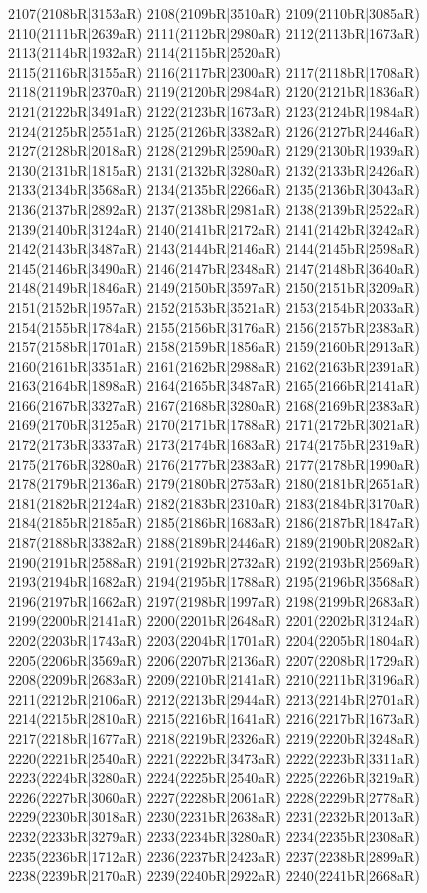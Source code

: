 2107(2108bR|3153aR) 2108(2109bR|3510aR) 2109(2110bR|3085aR) 2110(2111bR|2639aR) 2111(2112bR|2980aR) 2112(2113bR|1673aR) 2113(2114bR|1932aR) 2114(2115bR|2520aR) \\2115(2116bR|3155aR) 2116(2117bR|2300aR) 2117(2118bR|1708aR) 2118(2119bR|2370aR) 2119(2120bR|2984aR) 2120(2121bR|1836aR) 2121(2122bR|3491aR) 2122(2123bR|1673aR) 2123(2124bR|1984aR) \\2124(2125bR|2551aR) 2125(2126bR|3382aR) 2126(2127bR|2446aR) 2127(2128bR|2018aR) 2128(2129bR|2590aR) 2129(2130bR|1939aR) 2130(2131bR|1815aR) 2131(2132bR|3280aR) 2132(2133bR|2426aR) \\2133(2134bR|3568aR) 2134(2135bR|2266aR) 2135(2136bR|3043aR) 2136(2137bR|2892aR) 2137(2138bR|2981aR) 2138(2139bR|2522aR) 2139(2140bR|3124aR) 2140(2141bR|2172aR) 2141(2142bR|3242aR) \\2142(2143bR|3487aR) 2143(2144bR|2146aR) 2144(2145bR|2598aR) 2145(2146bR|3490aR) 2146(2147bR|2348aR) 2147(2148bR|3640aR) 2148(2149bR|1846aR) 2149(2150bR|3597aR) 2150(2151bR|3209aR) \\2151(2152bR|1957aR) 2152(2153bR|3521aR) 2153(2154bR|2033aR) 2154(2155bR|1784aR) 2155(2156bR|3176aR) 2156(2157bR|2383aR) 2157(2158bR|1701aR) 2158(2159bR|1856aR) 2159(2160bR|2913aR) \\2160(2161bR|3351aR) 2161(2162bR|2988aR) 2162(2163bR|2391aR) 2163(2164bR|1898aR) 2164(2165bR|3487aR) 2165(2166bR|2141aR) 2166(2167bR|3327aR) 2167(2168bR|3280aR) 2168(2169bR|2383aR) \\2169(2170bR|3125aR) 2170(2171bR|1788aR) 2171(2172bR|3021aR) 2172(2173bR|3337aR) 2173(2174bR|1683aR) 2174(2175bR|2319aR) 2175(2176bR|3280aR) 2176(2177bR|2383aR) 2177(2178bR|1990aR) \\2178(2179bR|2136aR) 2179(2180bR|2753aR) 2180(2181bR|2651aR) 2181(2182bR|2124aR) 2182(2183bR|2310aR) 2183(2184bR|3170aR) 2184(2185bR|2185aR) 2185(2186bR|1683aR) 2186(2187bR|1847aR) \\2187(2188bR|3382aR) 2188(2189bR|2446aR) 2189(2190bR|2082aR) 2190(2191bR|2588aR) 2191(2192bR|2732aR) 2192(2193bR|2569aR) 2193(2194bR|1682aR) 2194(2195bR|1788aR) 2195(2196bR|3568aR) \\2196(2197bR|1662aR) 2197(2198bR|1997aR) 2198(2199bR|2683aR) 2199(2200bR|2141aR) 2200(2201bR|2648aR) 2201(2202bR|3124aR) 2202(2203bR|1743aR) 2203(2204bR|1701aR) 2204(2205bR|1804aR) \\2205(2206bR|3569aR) 2206(2207bR|2136aR) 2207(2208bR|1729aR) 2208(2209bR|2683aR) 2209(2210bR|2141aR) 2210(2211bR|3196aR) 2211(2212bR|2106aR) 2212(2213bR|2944aR) 2213(2214bR|2701aR) \\2214(2215bR|2810aR) 2215(2216bR|1641aR) 2216(2217bR|1673aR) 2217(2218bR|1677aR) 2218(2219bR|2326aR) 2219(2220bR|3248aR) 2220(2221bR|2540aR) 2221(2222bR|3473aR) 2222(2223bR|3311aR) \\2223(2224bR|3280aR) 2224(2225bR|2540aR) 2225(2226bR|3219aR) 2226(2227bR|3060aR) 2227(2228bR|2061aR) 2228(2229bR|2778aR) 2229(2230bR|3018aR) 2230(2231bR|2638aR) 2231(2232bR|2013aR) \\2232(2233bR|3279aR) 2233(2234bR|3280aR) 2234(2235bR|2308aR) 2235(2236bR|1712aR) 2236(2237bR|2423aR) 2237(2238bR|2899aR) 2238(2239bR|2170aR) 2239(2240bR|2922aR) 2240(2241bR|2668aR) 